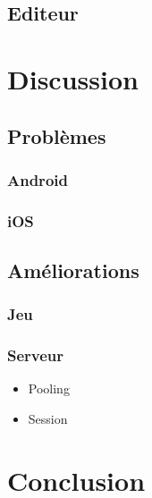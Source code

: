 \documentclass[]{report}
\begin{document}
	\section{Editeur}
	

\chapter{Discussion}
	\section{Problèmes}
		\subsection{Android}
		\subsection{iOS}
	\section{Améliorations}
		\subsection{Jeu}
		\subsection{Serveur}
			\begin{itemize}
				\item{Pooling}
				\item{Session}
			\end{itemize}
			
\chapter{Conclusion}
\end{document}
